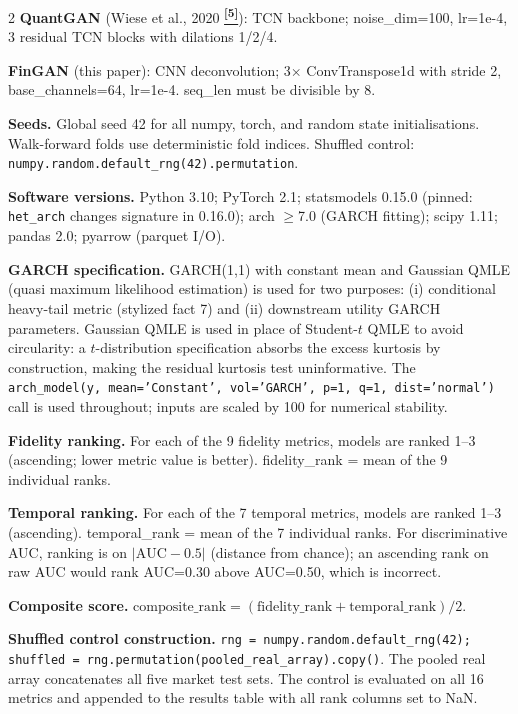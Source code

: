 \documentclass[10pt]{article}
\newcommand{\tcite}[1]{%
  \hyperlink{R:#1}{\textsuperscript{\scriptsize\textbf{[#1]}}}}
\begin{document}
\begin{multicols}{2}
\textbf{QuantGAN} (Wiese et al., 2020\tcite{5}): TCN backbone; noise\_dim=100, lr=1e-4, 3 residual TCN blocks with dilations 1/2/4.

\textbf{FinGAN} (this paper): CNN deconvolution; 3$\times$ ConvTranspose1d with stride 2, base\_channels=64, lr=1e-4. seq\_len must be divisible by 8.

\columnbreak

\textbf{Seeds.}
Global seed 42 for all numpy, torch, and random state initialisations. Walk-forward folds use deterministic fold indices. Shuffled control: \texttt{numpy.random.default\_rng(42).permutation}.

\textbf{Software versions.}
Python 3.10; PyTorch 2.1; statsmodels 0.15.0 (pinned: \texttt{het\_arch} changes signature in 0.16.0); arch $\geq$7.0 (GARCH fitting); scipy 1.11; pandas 2.0; pyarrow (parquet I/O).

\textbf{GARCH specification.}
GARCH(1,1) with constant mean and Gaussian QMLE (quasi maximum likelihood estimation) is used for two purposes: (i) conditional heavy-tail metric (stylized fact 7) and (ii) downstream utility GARCH parameters. Gaussian QMLE is used in place of Student-$t$ QMLE to avoid circularity: a $t$-distribution specification absorbs the excess kurtosis by construction, making the residual kurtosis test uninformative. The \texttt{arch\_model(y, mean='Constant', vol='GARCH', p=1, q=1, dist='normal')} call is used throughout; inputs are scaled by 100 for numerical stability.

\textbf{Fidelity ranking.}
For each of the 9 fidelity metrics, models are ranked 1--3 (ascending; lower metric value is better). fidelity\_rank = mean of the 9 individual ranks.

\textbf{Temporal ranking.}
For each of the 7 temporal metrics, models are ranked 1--3 (ascending). temporal\_rank = mean of the 7 individual ranks. For discriminative AUC, ranking is on $|\text{AUC} - 0.5|$ (distance from chance); an ascending rank on raw AUC would rank AUC=0.30 above AUC=0.50, which is incorrect.

\textbf{Composite score.}
$\text{composite\_rank} = (\text{fidelity\_rank} + \text{temporal\_rank}) / 2$.

\textbf{Shuffled control construction.}
\texttt{rng = numpy.random.default\_rng(42); shuffled = rng.permutation(pooled\_real\_array).copy()}. The pooled real array concatenates all five market test sets. The control is evaluated on all 16 metrics and appended to the results table with all rank columns set to NaN.


\end{multicols}
\end{document}
